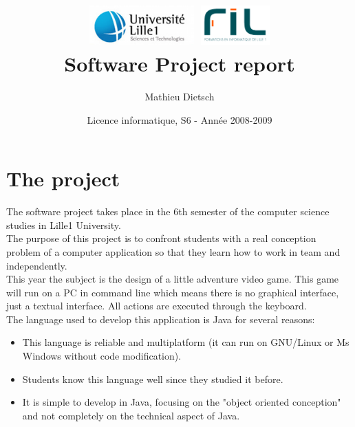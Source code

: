 \documentclass[a4paper,6pt]{article}
\begin{document}
\title{\includegraphics[height=1.5cm]{lille1.png}   \includegraphics[height=1.5cm]{fil.png}     \\\textbf{Software Project report}}
\author{Mathieu Dietsch}
\date{Licence informatique, S6 - Année 2008-2009}
\maketitle

\hbox{}

\tableofcontents


\section{The project}

The software project takes place in the 6th semester of the computer science studies in Lille1 University.\\
The purpose of this project is to confront students with a real conception problem of a computer application so that they learn how to work in team and independently.\\

This year the subject is the design of a little adventure video game. This game will run on a PC in command line which means there is no graphical interface, just a textual interface. All actions are executed through the keyboard.\\

The language used to develop this application is Java for several reasons:
\begin{itemize}
\item This language is reliable and multiplatform (it can run on GNU/Linux or Ms Windows without code modification).
\item Students know this language well since they studied it before.
\item It is simple to develop in Java, focusing on the "object oriented conception" and not completely on the technical aspect of Java.
\end{itemize}
\end{document}
